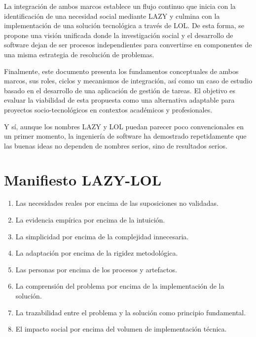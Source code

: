 \documentclass[14pt,a4paper,oneside]{extbook}
\begin{document}
La integración de ambos marcos establece un flujo continuo que inicia con la identificación de una necesidad social mediante LAZY y culmina con la implementación de una solución tecnológica a través de LOL. De esta forma, se propone una visión unificada donde la investigación social y el desarrollo de software dejan de ser procesos independientes para convertirse en componentes de una misma estrategia de resolución de problemas.

Finalmente, este documento presenta los fundamentos conceptuales de ambos marcos, sus roles, ciclos y mecanismos de integración, así como un caso de estudio basado en el desarrollo de una aplicación de gestión de tareas. El objetivo es evaluar la viabilidad de esta propuesta como una alternativa adaptable para proyectos socio-tecnológicos en contextos académicos y profesionales.

Y sí, aunque los nombres LAZY y LOL puedan parecer poco convencionales en un primer momento, la ingeniería de software ha demostrado repetidamente que las buenas ideas no dependen de nombres serios, sino de resultados serios.


\chapter*{Manifiesto LAZY-LOL}

\begin{tcolorbox}[colback=gray!5, colframe=black!60, title=Manifiesto de Principios]

\begin{enumerate}
    \item Las necesidades reales por encima de las suposiciones no validadas.
    \item La evidencia empírica por encima de la intuición.
    \item La simplicidad por encima de la complejidad innecesaria.
    \item La adaptación por encima de la rigidez metodológica.
    \item Las personas por encima de los procesos y artefactos.
    \item La comprensión del problema por encima de la implementación de la solución.
    \item La trazabilidad entre el problema y la solución como principio fundamental.
    \item El impacto social por encima del volumen de implementación técnica.
\end{enumerate}

\end{tcolorbox}
\end{document}
